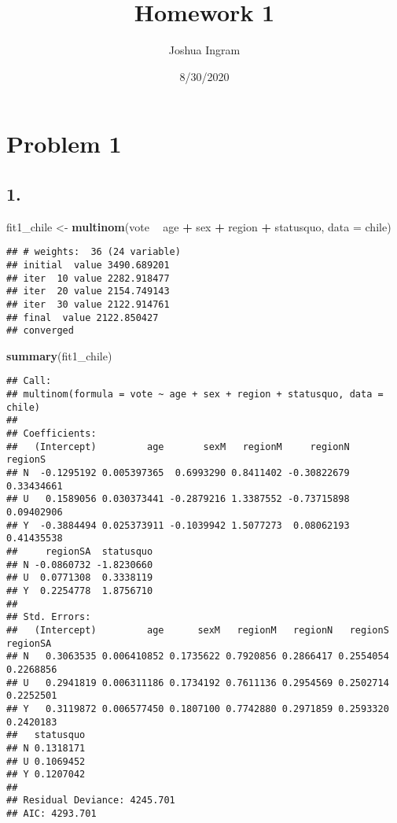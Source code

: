 \documentclass[
]{article}
\title{Homework 1}
\author{Joshua Ingram}
\date{8/30/2020}
\newenvironment{Shaded}{\begin{snugshade}}{\end{snugshade}}
\newcommand{\DataTypeTok}[1]{\textcolor[rgb]{0.13,0.29,0.53}{#1}}
\newcommand{\KeywordTok}[1]{\textcolor[rgb]{0.13,0.29,0.53}{\textbf{#1}}}
\newcommand{\NormalTok}[1]{#1}
\newcommand{\OperatorTok}[1]{\textcolor[rgb]{0.81,0.36,0.00}{\textbf{#1}}}
\newcommand{\StringTok}[1]{\textcolor[rgb]{0.31,0.60,0.02}{#1}}
\begin{document}
\maketitle

\hypertarget{problem-1}{%
\section{Problem 1}\label{problem-1}}

\hypertarget{section}{%
\subsection{1.}\label{section}}

\begin{Shaded}
\begin{Highlighting}[]
\NormalTok{fit1_chile <-}\StringTok{ }\KeywordTok{multinom}\NormalTok{(vote }\OperatorTok{~}\StringTok{ }\NormalTok{age }\OperatorTok{+}\StringTok{ }\NormalTok{sex }\OperatorTok{+}\StringTok{ }\NormalTok{region }\OperatorTok{+}\StringTok{ }\NormalTok{statusquo, }\DataTypeTok{data =}\NormalTok{ chile)}
\end{Highlighting}
\end{Shaded}

\begin{verbatim}
## # weights:  36 (24 variable)
## initial  value 3490.689201 
## iter  10 value 2282.918477
## iter  20 value 2154.749143
## iter  30 value 2122.914761
## final  value 2122.850427 
## converged
\end{verbatim}

\begin{Shaded}
\begin{Highlighting}[]
\KeywordTok{summary}\NormalTok{(fit1_chile)}
\end{Highlighting}
\end{Shaded}

\begin{verbatim}
## Call:
## multinom(formula = vote ~ age + sex + region + statusquo, data = chile)
## 
## Coefficients:
##   (Intercept)         age       sexM   regionM     regionN    regionS
## N  -0.1295192 0.005397365  0.6993290 0.8411402 -0.30822679 0.33434661
## U   0.1589056 0.030373441 -0.2879216 1.3387552 -0.73715898 0.09402906
## Y  -0.3884494 0.025373911 -0.1039942 1.5077273  0.08062193 0.41435538
##     regionSA  statusquo
## N -0.0860732 -1.8230660
## U  0.0771308  0.3338119
## Y  0.2254778  1.8756710
## 
## Std. Errors:
##   (Intercept)         age      sexM   regionM   regionN   regionS  regionSA
## N   0.3063535 0.006410852 0.1735622 0.7920856 0.2866417 0.2554054 0.2268856
## U   0.2941819 0.006311186 0.1734192 0.7611136 0.2954569 0.2502714 0.2252501
## Y   0.3119872 0.006577450 0.1807100 0.7742880 0.2971859 0.2593320 0.2420183
##   statusquo
## N 0.1318171
## U 0.1069452
## Y 0.1207042
## 
## Residual Deviance: 4245.701 
## AIC: 4293.701
\end{verbatim}
\end{document}
